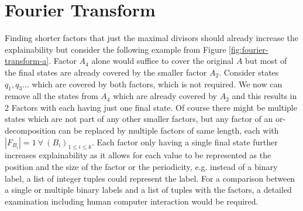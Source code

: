 \section{Fourier Transform}
\label{ch:novel-algos:fourier}
Finding shorter factors that just the maximal divisors should already increase the explainability but consider the following example from Figure \ref{fig:fourier-transform-a}. Factor $A_4$ alone would suffice to cover the original \DFA $A$ but most of the final states are already covered by the smaller factor $A_2$. Consider states $q_1, q_3 \dots$ which are covered by both factors, which is not required. We now can remove all the states from $A_4$ which are already covered by $A_2$ and this results in 2 Factors with each having just one final state. Of course there might be multiple states which are not part of any other smaller factors, but any factor of an or-decomposition can be replaced by multiple factors of same length, each with $|F_{B_i}| = 1 ~\forall~ (B_i)_{1 \leq i \leq k}$. Each factor only having a single final state further increases explainability as it allows for each value to be represented as the position and the size of the factor or the periodicity, e.g. instead of a binary label, a list of integer tuples could represent the label. For a comparison between a single or multiple binary labels and a list of tuples with the factors, a detailed examination including human computer interaction would be required.

